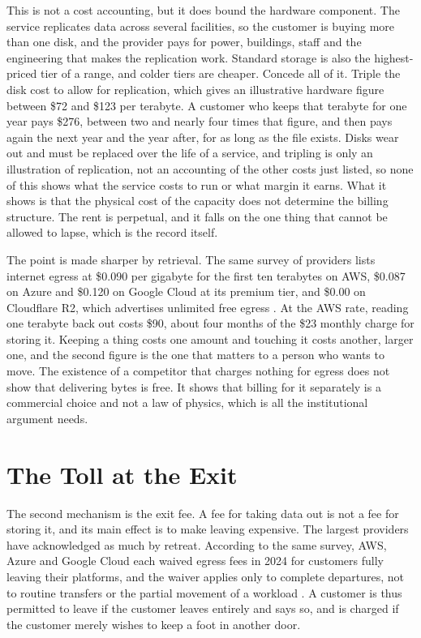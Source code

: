 \documentclass[11pt]{article}
\begin{document}
This is not a cost accounting, but it does bound the hardware component. The service replicates data across several facilities, so the customer is buying more than one disk, and the provider pays for power, buildings, staff and the engineering that makes the replication work. Standard storage is also the highest-priced tier of a range, and colder tiers are cheaper. Concede all of it. Triple the disk cost to allow for replication, which gives an illustrative hardware figure between \$72 and \$123 per terabyte. A customer who keeps that terabyte for one year pays \$276, between two and nearly four times that figure, and then pays again the next year and the year after, for as long as the file exists. Disks wear out and must be replaced over the life of a service, and tripling is only an illustration of replication, not an accounting of the other costs just listed, so none of this shows what the service costs to run or what margin it earns. What it shows is that the physical cost of the capacity does not determine the billing structure. The rent is perpetual, and it falls on the one thing that cannot be allowed to lapse, which is the record itself.

The point is made sharper by retrieval. The same survey of providers lists internet egress at \$0.090 per gigabyte for the first ten terabytes on AWS, \$0.087 on Azure and \$0.120 on Google Cloud at its premium tier, and \$0.00 on Cloudflare R2, which advertises unlimited free egress \cite{ecorpit}. At the AWS rate, reading one terabyte back out costs \$90, about four months of the \$23 monthly charge for storing it. Keeping a thing costs one amount and touching it costs another, larger one, and the second figure is the one that matters to a person who wants to move. The existence of a competitor that charges nothing for egress does not show that delivering bytes is free. It shows that billing for it separately is a commercial choice and not a law of physics, which is all the institutional argument needs.

\section{The Toll at the Exit}

The second mechanism is the exit fee. A fee for taking data out is not a fee for storing it, and its main effect is to make leaving expensive. The largest providers have acknowledged as much by retreat. According to the same survey, AWS, Azure and Google Cloud each waived egress fees in 2024 for customers fully leaving their platforms, and the waiver applies only to complete departures, not to routine transfers or the partial movement of a workload \cite{ecorpit}. A customer is thus permitted to leave if the customer leaves entirely and says so, and is charged if the customer merely wishes to keep a foot in another door.
\end{document}
